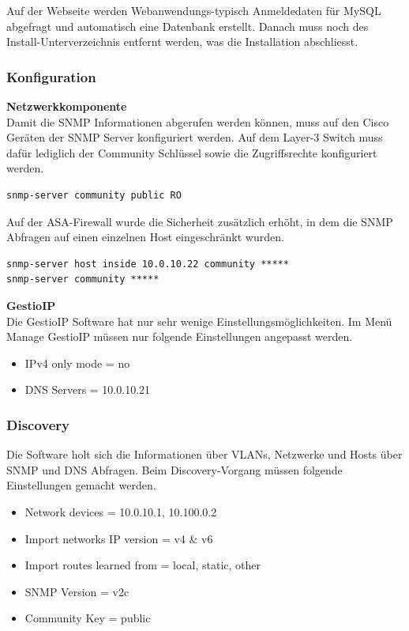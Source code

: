 \documentclass[11pt,a4paper,parskip=half]{scrartcl}
\begin{document}
Auf der Webseite werden Webanwendungs-typisch Anmeldedaten für MySQL abgefragt und automatisch eine Datenbank erstellt. Danach muss noch des Install-Unterverzeichnis entfernt werden, was die Installation abschliesst.


\subsubsection{Konfiguration}
\textbf{Netzwerkkomponente}\\
Damit die SNMP Informationen abgerufen werden können, muss auf den Cisco Geräten der SNMP Server konfiguriert werden. Auf dem Layer-3 Switch muss dafür lediglich der Community Schlüssel sowie die Zugriffsrechte konfiguriert werden.
\begin{lstlisting}
snmp-server community public RO
\end{lstlisting}
Auf der ASA-Firewall wurde die Sicherheit zusätzlich erhöht, in dem die SNMP Abfragen auf einen einzelnen Host eingeschränkt wurden.
\begin{lstlisting}
snmp-server host inside 10.0.10.22 community *****
snmp-server community *****
\end{lstlisting}
\textbf{GestioIP}\\
Die GestioIP Software hat nur sehr wenige Einstellungsmöglichkeiten. Im Menü \glqq{}Manage GestioIP\grqq{} müssen nur folgende Einstellungen angepasst werden.
\begin{itemize}
	\item{IPv4 only mode = no}
	\item{DNS Servers = 10.0.10.21}
\end{itemize}

\subsubsection{Discovery}
Die Software holt sich die Informationen über VLANs, Netzwerke und Hosts über SNMP und DNS Abfragen. Beim Discovery-Vorgang müssen folgende Einstellungen gemacht werden.
\begin{itemize}
	\item{Network devices = 10.0.10.1, 10.100.0.2}
	\item{Import networks IP version = v4 \& v6}
	\item{Import routes learned from = local, static, other}
	\item{SNMP Version = v2c}
	\item{Community Key = public}
\end{itemize}
\end{document}
